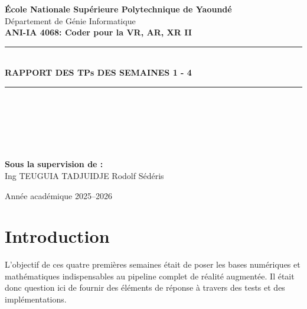 \documentclass[12pt,a4paper]{report}
\begin{document}
\begin{titlepage}
\begin{center}
\vspace*{5cm}


\textbf{\Large École Nationale Supérieure Polytechnique de Yaoundé}\\
Département de Génie Informatique\\[1cm]


\textbf{ANI-IA 4068: Coder pour la VR, AR, XR II}\\[1cm]

\rule{\textwidth}{0.5pt}\\
{\LARGE \textbf{RAPPORT DES TPs DES SEMAINES 1 - 4}}\\
\rule{\textwidth}{0.5pt}\\[2cm]

\end{center}
\begin{center}
\begin{flushleft}

\\
\\
\\[1cm]
\end{flushleft}

\begin{flushleft}
\textbf{Sous la supervision de :}\\
Ing TEUGUIA TADJUIDJE Rodolf Sédéris
\end{flushleft}

\vfill
Année académique 2025--2026
\end{center}
\end{titlepage}

\tableofcontents
\clearpage
{}

\chapter*{Introduction}

L'objectif de ces quatre premières semaines était de poser les bases numériques et mathématiques indispensables au pipeline complet de réalité augmentée.
Il était donc question ici de fournir des éléments de réponse à travers des tests et des implémentations.
\end{document}
